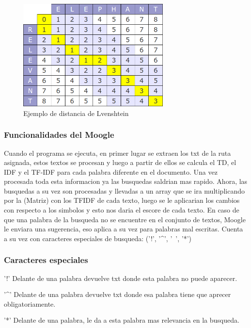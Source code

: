 \documentclass{beamer}
\begin{document}
\begin{figure}[h]
    \centering
	\includegraphics[width=0.68\textwidth]{diagrama.png}
    \caption{Ejemplo de distancia de Lvenshtein}
    \label{img:3}
\end{figure}







\begin{frame}
	\frametitle{Funcionalidades del Moogle}
	\begin{minipage}{10 cm}
		Cuando el programa se ejecuta, en primer lugar se extraen los txt de la ruta asignada, estos textos se procesan y luego a partir de ellos se calcula el TD, el IDF y el TF-IDF para cada palabra diferente en el documento. Una vez procesada toda esta informacion ya las busquedas saldrian mas rapido. Ahora, las busquedas a su vez son procesadas y llevadas a un array que se ira multiplicando por la (Matriz) con los TFIDF de cada texto, luego se le aplicarian los cambios con respecto a los simbolos y esto nos daria el escore de cada texto. En caso de que una palabra de la busqueda no se encuentre en el conjunto de textos, Moogle le enviara una sugerencia, eso aplica a su vez para palabras mal escritas. 
Cuenta a su vez con caracteres especiales de busqueda: ('!', '\^{}', '~', '*')
	\end{minipage}
\end{frame}





\begin{frame}
	\frametitle{Caracteres especiales}
	\begin{minipage}{10cm}
	\begin{alertblock}{'!'}
		 Delante de una palabra devuelve txt donde esta palabra no puede aparecer.
	\end{alertblock}
	\begin{alertblock}{'\^{}'}
		Delante de una palabra devuelve txt donde esa palabra tiene que aprecer obligatoriamente.
	\end{alertblock}

      \begin{alertblock}{'*'}
            Delante de una palabra, le da a esta palabra mas relevancia en la busqueda. 
      \end{alertblock} 
	\end{minipage}
\end{frame}
\end{document}
